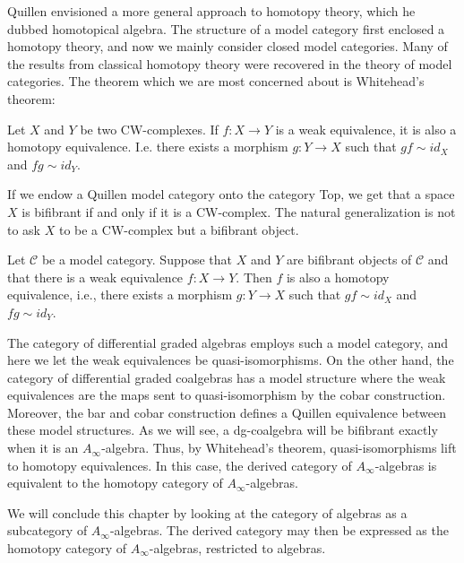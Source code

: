\documentclass[../thesis.tex]{subfiles}
\begin{document}
        Quillen envisioned a more general approach to homotopy theory, which he dubbed homotopical algebra. The structure of a model category first enclosed a homotopy theory, and now we mainly consider closed model categories. Many of the results from classical homotopy theory were recovered in the theory of model categories. The theorem which we are most concerned about is Whitehead's theorem:

        \begin{thm}
            Let $X$ and $Y$ be two CW-complexes. If $f:X \rightarrow Y$ is a weak equivalence, it is also a homotopy equivalence. I.e. there exists a morphism $g: Y\rightarrow X$ such that $gf\sim id_X$ and $fg\sim id_Y$.
        \end{thm}

        If we endow a Quillen model category onto the category Top, we get that a space $X$ is bifibrant if and only if it is a CW-complex. The natural generalization is not to ask $X$ to be a CW-complex but a bifibrant object.

        \begin{thm}
            Let $\mathcal{C}$ be a model category. Suppose that $X$ and $Y$ are bifibrant objects of $\mathcal{C}$ and that there is a weak equivalence $f: X\rightarrow Y$. Then $f$ is also a homotopy equivalence, i.e., there exists a morphism $g: Y\rightarrow X$ such that $gf\sim id_X$ and $fg\sim id_Y$.
        \end{thm}

        The category of differential graded algebras employs such a model category, and here we let the weak equivalences be quasi-isomorphisms. On the other hand, the category of differential graded coalgebras has a model structure where the weak equivalences are the maps sent to quasi-isomorphism by the cobar construction. Moreover, the bar and cobar construction defines a Quillen equivalence between these model structures. As we will see, a dg-coalgebra will be bifibrant exactly when it is an $A_\infty$-algebra. Thus, by Whitehead's theorem, quasi-isomorphisms lift to homotopy equivalences. In this case, the derived category of $A_\infty$-algebras is equivalent to the homotopy category of $A_\infty$-algebras.

        We will conclude this chapter by looking at the category of algebras as a subcategory of $A_\infty$-algebras. The derived category may then be expressed as the homotopy category of $A_\infty$-algebras, restricted to algebras.
\end{document}
